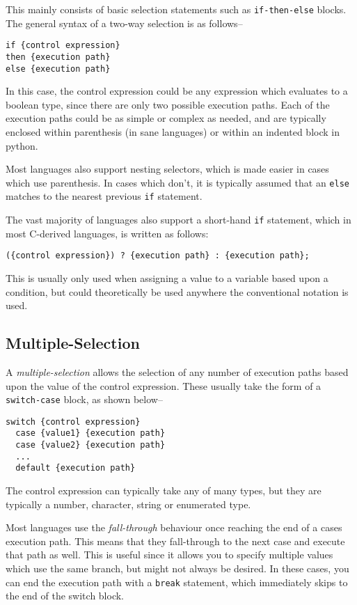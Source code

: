 This mainly consists of basic selection statements such as \verb`if-then-else` blocks. The general syntax of a two-way
 selection is as follows--
\begin{verbatim}
if {control expression}
then {execution path}
else {execution path}
\end{verbatim}
In this case, the control expression could be any expression which evaluates to a boolean type, since there are only two
 possible execution paths. Each of the execution paths could be as simple or complex as needed, and are typically
 enclosed within parenthesis (in sane languages) or within an indented block in python.

Most languages also support nesting selectors, which is made easier in cases which use parenthesis. In cases which don't,
 it is typically assumed that an \verb`else` matches to the nearest previous \verb`if` statement.

The vast majority of languages also support a short-hand \verb`if` statement, which in most C-derived languages, is
 written as follows:
\begin{verbatim}
({control expression}) ? {execution path} : {execution path};
\end{verbatim}
This is usually only used when assigning a value to a variable based upon a condition, but could theoretically be used
 anywhere the conventional notation is used.

\subsection*{Multiple-Selection}

A \textit{multiple-selection} allows the selection of any number of execution paths based upon the value of the control
 expression. These usually take the form of a \verb`switch-case` block, as shown below--
\begin{verbatim}
switch {control expression}
  case {value1} {execution path}
  case {value2} {execution path}
  ...
  default {execution path}
\end{verbatim}
The control expression can typically take any of many types, but they are typically a number, character, string or
 enumerated type.

Most languages use the \textit{fall-through} behaviour once reaching the end of a cases execution path. This means that
 they fall-through to the next case and execute that path as well. This is useful since it allows you to specify multiple
 values which use the same branch, but might not always be desired. In these cases, you can end the execution path with
 a \verb`break` statement, which immediately skips to the end of the switch block.

